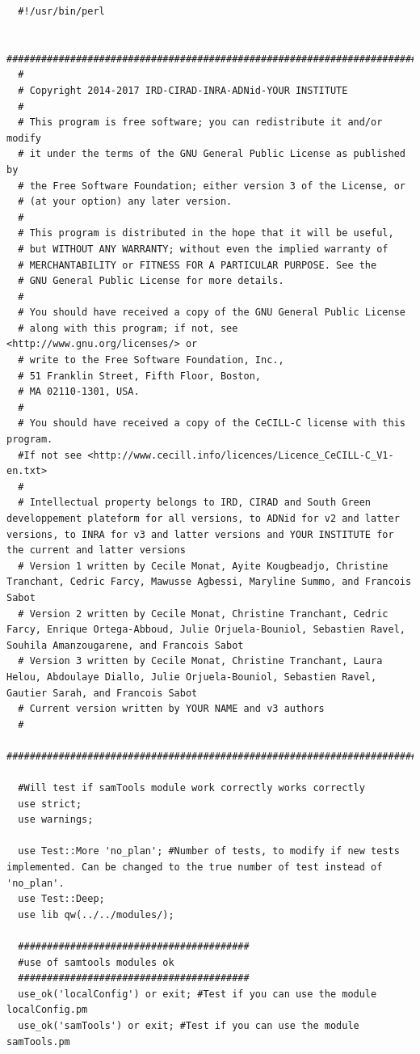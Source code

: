\documentclass[a4paper,10pt]{report}
\begin{document}
\begin{lstlisting}
  #!/usr/bin/perl

  ################################################################################################################################
  #
  # Copyright 2014-2017 IRD-CIRAD-INRA-ADNid-YOUR INSTITUTE
  #
  # This program is free software; you can redistribute it and/or modify
  # it under the terms of the GNU General Public License as published by
  # the Free Software Foundation; either version 3 of the License, or
  # (at your option) any later version.
  #
  # This program is distributed in the hope that it will be useful,
  # but WITHOUT ANY WARRANTY; without even the implied warranty of
  # MERCHANTABILITY or FITNESS FOR A PARTICULAR PURPOSE. See the
  # GNU General Public License for more details.
  #
  # You should have received a copy of the GNU General Public License
  # along with this program; if not, see <http://www.gnu.org/licenses/> or
  # write to the Free Software Foundation, Inc.,
  # 51 Franklin Street, Fifth Floor, Boston,
  # MA 02110-1301, USA.
  #
  # You should have received a copy of the CeCILL-C license with this program.
  #If not see <http://www.cecill.info/licences/Licence_CeCILL-C_V1-en.txt>
  #
  # Intellectual property belongs to IRD, CIRAD and South Green developpement plateform for all versions, to ADNid for v2 and latter versions, to INRA for v3 and latter versions and YOUR INSTITUTE for the current and latter versions
  # Version 1 written by Cecile Monat, Ayite Kougbeadjo, Christine Tranchant, Cedric Farcy, Mawusse Agbessi, Maryline Summo, and Francois Sabot
  # Version 2 written by Cecile Monat, Christine Tranchant, Cedric Farcy, Enrique Ortega-Abboud, Julie Orjuela-Bouniol, Sebastien Ravel, Souhila Amanzougarene, and Francois Sabot
  # Version 3 written by Cecile Monat, Christine Tranchant, Laura Helou, Abdoulaye Diallo, Julie Orjuela-Bouniol, Sebastien Ravel, Gautier Sarah, and Francois Sabot 
  # Current version written by YOUR NAME and v3 authors
  #
  ################################################################################################################################

  #Will test if samTools module work correctly works correctly
  use strict;
  use warnings;

  use Test::More 'no_plan'; #Number of tests, to modify if new tests implemented. Can be changed to the true number of test instead of 'no_plan'.
  use Test::Deep;
  use lib qw(../../modules/);

  ########################################
  #use of samtools modules ok
  ########################################
  use_ok('localConfig') or exit; #Test if you can use the module localConfig.pm
  use_ok('samTools') or exit; #Test if you can use the module samTools.pm


\end{lstlisting}
\end{document}
